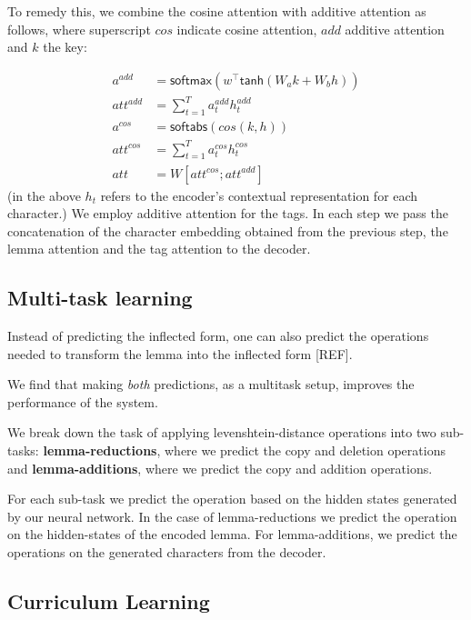 \documentclass[11pt,a4paper]{article}
\begin{document}
To remedy this, we combine the cosine attention with additive
attention as follows, where superscript $cos$ indicate cosine attention,
$add$ additive attention and $k$ the key:

\begin{align*}
	a^{add} & = \mathsf{softmax}(w^\top\mathsf{tanh}(W_ak + W_bh))\\
	att^{add} & = \sum_{t=1}^{T}a_t^{add}h_t^{add}\\
	a^{cos} & = \mathsf{softabs}(cos(k,h))\\
	att^{cos} & = \sum_{t=1}^{T}a_t^{cos}h_t^{cos}\\
	att & = W[att^{cos}; att^{add}]
\end{align*}
(in the above $h_t$ refers to the encoder's contextual representation for each character.)
We employ additive attention for the tags. In each step we pass the
concatenation of the character embedding obtained from the previous
step, the lemma attention and the tag attention to the decoder.


\subsection{Multi-task learning}

Instead of predicting the inflected form, one can also predict the
operations needed to transform the lemma into the inflected form
[REF].

We find that making \emph{both} predictions, as a multitask setup,
improves the performance of the system.

We break down the task of applying levenshtein-distance operations
into two sub-tasks: \textbf{lemma-reductions}, where we predict the copy and
deletion operations and \textbf{lemma-additions}, where we predict the copy and
addition operations. 

For each sub-task we predict the operation based on the hidden states
generated by our neural network. In the case of lemma-reductions we
predict the operation on the hidden-states of the encoded lemma. For
lemma-additions, we predict the operations on the generated characters
from the decoder.

\subsection{Curriculum Learning}
\end{document}
